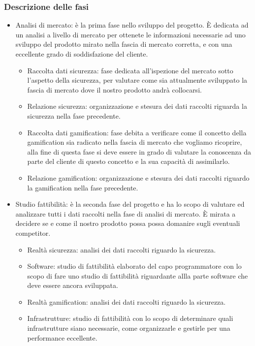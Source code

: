 \subsubsection{Descrizione delle fasi}
\begin{itemize}
\item Analisi di mercato: è la prima fase nello sviluppo del progetto. È dedicata ad un analisi a livello di mercato per ottenete le informazioni necessarie ad uno sviluppo del prodotto mirato nella fascia di mercato corretta, e con una eccellente grado di soddisfazione del cliente.
\begin{itemize}
\item Raccolta dati sicurezza: fase dedicata all'ispezione del mercato sotto l'aspetto della sicurezza, per valutare come sia attualmente sviluppato la fascia di mercato dove il nostro prodotto andrà collocarsi.
\item Relazione sicurezza: organizzazione e stesura dei dati raccolti riguarda la sicurezza nella fase precedente.
\item Raccolta dati gamification: fase debita a verificare come il concetto della gamification sia radicato nella fascia di mercato che vogliamo ricoprire, alla fine di questa fase si deve essere in grado di valutare la conoscenza da parte del cliente di questo concetto e la sua capacità di assimilarlo.
\item Relazione gamification: organizzazione e stesura dei dati raccolti riguardo la gamification nella fase precedente.
\end{itemize}
\item Studio fattibilità: è la seconda fase del progetto e ha lo scopo di valutare ed analizzare tutti i dati raccolti nella fase di analisi di mercato. È mirata a decidere se e come il nostro prodotto possa possa domanire sugli eventuali competitor.
\begin{itemize}
\item Realtà sicurezza: analisi dei dati raccolti riguardo la sicurezza.
\item Software: studio di fattibilità elaborato del capo programmatore con lo scopo di fare uno studio di fattibilità riguardante allla parte software che deve essere ancora sviluppata.
\item Realtà gamification: analisi dei dati raccolti riguardo la sicurezza.
\item Infrastrutture: studio di fattibilità con lo scopo di determinare quali infrastrutture siano necessarie, come organizzarle e gestirle per una performance eccellente.

\end{itemize}
\end{itemize}

